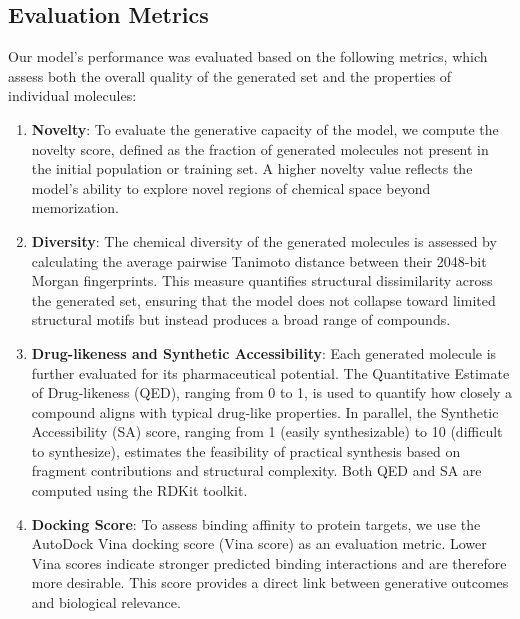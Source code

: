\documentclass[lettersize,journal]{IEEEtran}
\begin{document}
\subsection{Evaluation Metrics}
Our model's performance was evaluated based on the following metrics, which assess both the overall quality of the generated set and the properties of individual molecules:
\begin{enumerate}
    \item \textbf{Novelty}: To evaluate the generative capacity of the model, we compute the novelty score, defined as the fraction of generated molecules not present in the initial population or training set. A higher novelty value reflects the model’s ability to explore novel regions of chemical space beyond memorization.
    \item \textbf{Diversity}: The chemical diversity of the generated molecules is assessed by calculating the average pairwise Tanimoto distance between their 2048-bit Morgan fingerprints. This measure quantifies structural dissimilarity across the generated set, ensuring that the model does not collapse toward limited structural motifs but instead produces a broad range of compounds.  
    \item \textbf{Drug-likeness and Synthetic Accessibility}: Each generated molecule is further evaluated for its pharmaceutical potential. The Quantitative Estimate of Drug-likeness (QED), ranging from 0 to 1, is used to quantify how closely a compound aligns with typical drug-like properties. In parallel, the Synthetic Accessibility (SA) score, ranging from 1 (easily synthesizable) to 10 (difficult to synthesize), estimates the feasibility of practical synthesis based on fragment contributions and structural complexity. Both QED and SA are computed using the RDKit toolkit.  
    \item \textbf{Docking Score}: To assess binding affinity to protein targets, we use the AutoDock Vina docking score (Vina score) as an evaluation metric. Lower Vina scores indicate stronger predicted binding interactions and are therefore more desirable. This score provides a direct link between generative outcomes and biological relevance.  

\end{enumerate}

\end{document}
